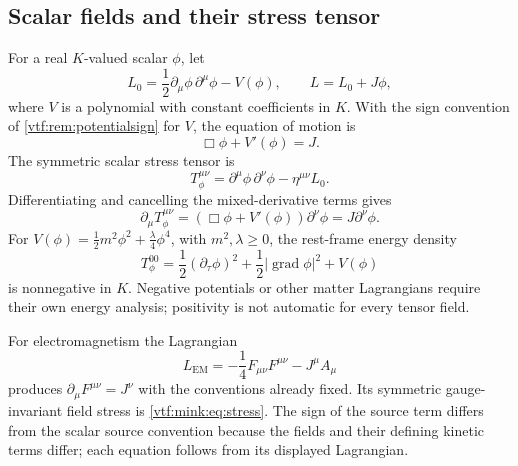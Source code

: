 \documentclass[11pt,letterpaper]{article}
\theoremstyle{definition}
\theoremstyle{remark}
\newcommand{\grad}{\operatorname{grad}}\newcommand{\Div}{\operatorname{div}}
\begin{document}
\subsection{Scalar fields and their stress tensor}
For a real $K$-valued scalar $\phi$, let
\begin{equation}
 L_0=\frac12\partial_\mu\phi\,\partial^\mu\phi-V(\phi),
 \qquad L=L_0+J\phi,
\end{equation}
where $V$ is a polynomial with constant coefficients in $K$. With the sign convention of \cref{vtf:rem:potentialsign} for $V$, the
equation of motion is
\begin{equation}\label{vtf:mink:eq:scalarfield}
 \Box\phi+V'(\phi)=J.
\end{equation}
The symmetric scalar stress tensor is
\begin{equation}\label{vtf:mink:eq:scalarstress}
 T^{\mu\nu}_\phi
 =\partial^\mu\phi\,\partial^\nu\phi-\eta^{\mu\nu}L_0.
\end{equation}
Differentiating and cancelling the mixed-derivative terms gives
\begin{equation}
 \partial_\mu T^{\mu\nu}_\phi
 =(\Box\phi+V'(\phi))\partial^\nu\phi
 =J\partial^\nu\phi.
\end{equation}
For $V(\phi)=\tfrac12m^2\phi^2+\tfrac\lambda4\phi^4$, with $m^2,\lambda\geq0$, the rest-frame energy density
\begin{equation}
 T^{00}_\phi=\frac12(\partial_\tau\phi)^2
             +\frac12|\grad\phi|^2+V(\phi)
\end{equation}
is nonnegative in $K$. Negative potentials or other matter Lagrangians require their own energy analysis; positivity is not automatic for every tensor field.

For electromagnetism the Lagrangian
\begin{equation}
 L_{\mathrm{EM}}=-\frac14F_{\mu\nu}F^{\mu\nu}-J^\mu A_\mu
\end{equation}
produces $\partial_\mu F^{\mu\nu}=J^\nu$ with the conventions already fixed. Its symmetric gauge-invariant field stress is \cref{vtf:mink:eq:stress}. The sign of the source term differs from the scalar source convention because the fields and their defining kinetic terms differ; each equation follows from its displayed Lagrangian.
\end{document}
